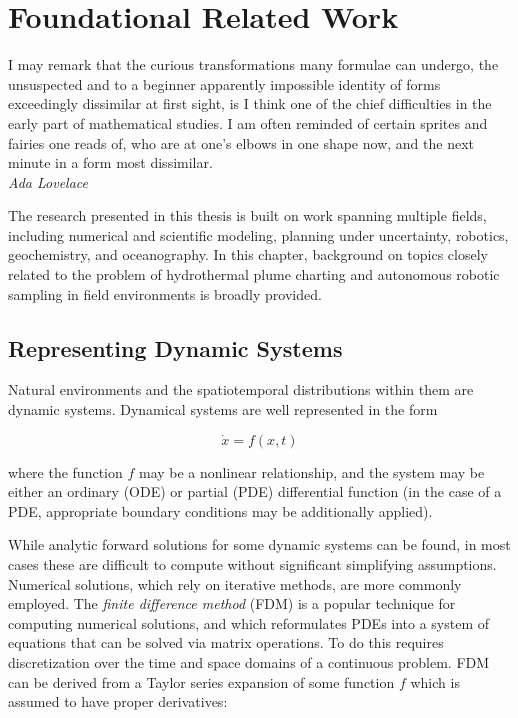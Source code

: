 \chapter{Foundational Related Work}
\label{chap:related_work}

\begin{center}
    \begin{minipage}{0.7\textwidth}
      \begin{small}
        I may remark that the curious transformations many formulae can undergo, the unsuspected and to a beginner apparently impossible identity of forms exceedingly dissimilar at first sight, is I think one of the chief difficulties in the early part of mathematical studies. I am often reminded of certain sprites and fairies one reads of, who are at one's elbows in one shape now, and the next minute in a form most dissimilar.\\ \emph{Ada Lovelace}
      \end{small}
    \end{minipage}
    \vspace{0.5cm}
\end{center}

The research presented in this thesis is built on work spanning multiple fields, including numerical and scientific modeling, planning under uncertainty, robotics, geochemistry, and oceanography. In this chapter, background on topics closely related to the problem of hydrothermal plume charting and autonomous robotic sampling in field environments is broadly provided.

\section{Representing Dynamic Systems}
\label{sec:dyn_sys}
Natural environments and the spatiotemporal distributions within them are dynamic systems.
Dynamical systems are well represented in the form

\begin{equation}
    \dot{x} = f(x,t)
\end{equation}

\noindent where the function $f$ may be a nonlinear relationship, and the system may be either an ordinary (ODE) or partial (PDE) differential function (in the case of a PDE, appropriate boundary conditions may be additionally applied).

While analytic forward solutions for some dynamic systems can be found, in most cases these are difficult to compute without significant simplifying assumptions. Numerical solutions, which rely on iterative methods, are more commonly employed. The \emph{finite difference method}\autocite{smith1985numerical} (FDM) is a popular technique for computing numerical solutions, and which reformulates PDEs into a system of equations that can be solved via matrix operations. To do this requires discretization over the time and space domains of a continuous problem. FDM can be derived from a Taylor series expansion of some function $f$ which is assumed to have proper derivatives:

